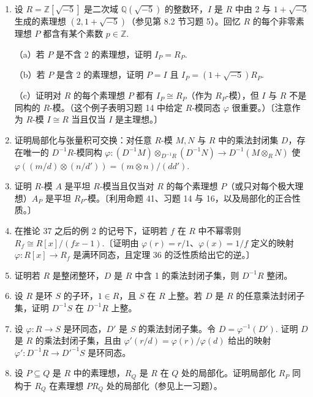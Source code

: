 \begin{enumerate}
\item 设 \(R = \mathbb{Z}[\sqrt{-5}]\) 是二次域 \(\mathbb{Q}(\sqrt{-5})\) 的整数环，\(I\) 是 \(R\) 中由 2 与 \(1+\sqrt{-5}\) 生成的素理想 \((2, 1+\sqrt{-5})\)（参见第 8.2 节习题 5）。回忆 \(R\) 的每个非零素理想 \(P\) 都含有某个素数 \(p \in \mathbb{Z}\).

（a）若 \(P\) 是不含 2 的素理想，证明 \(I_P = R_P\).

（b）若 \(P\) 是含 2 的素理想，证明 \(P = I\) 且 \(I_P = (1+\sqrt{-5})R_P\).

（c）证明对 \(R\) 的每个素理想 \(P\) 都有 \(I_P \cong R_P\)（作为 \(R_P\)-模），但 \(I\) 与 \(R\) 不是同构的 \(R\)-模。（这个例子表明习题 14 中给定 \(R\)-模同态 \(\varphi\) 很重要。）〔注意作为 \(R\)-模 \(I \cong R\) 当且仅当 \(I\) 是主理想。〕

\item 证明局部化与张量积可交换：对任意 \(R\)-模 \(M, N\) 与 \(R\) 中的乘法封闭集 \(D\)，存在唯一的 \(D^{-1}R\)-模同构 \(\varphi : (D^{-1}M)\otimes_{D^{-1}R}(D^{-1}N) \to D^{-1}(M \otimes_RN)\) 使 \(\varphi((m/d)\otimes(n/d')) = (m \otimes n)/(dd')\).

\item 证明 \(R\)-模 \(A\) 是平坦 \(R\)-模当且仅当对 \(R\) 的每个素理想 \(P\)（或只对每个极大理想）\(A_P\) 是平坦 \(R_P\)-模。〔利用命题 41、习题 14 与 16，以及局部化的正合性质。〕

\item 在推论 37 之后的例 2 的记号下，证明若 \(f\) 在 \(R\) 中不幂零则 \(R_f \cong R[x]/(fx-1)\).〔证明由 \(\varphi(r) = r/1\)、\(\varphi(x) = 1/f\) 定义的映射 \(\varphi : R[x] \to R_f\) 是满环同态，且定理 36 的泛性质给出它的逆。〕

\item 证明若 \(R\) 是整闭整环，\(D\) 是 \(R\) 中含 1 的乘法封闭子集，则 \(D^{-1}R\) 整闭。

\item 设 \(R\) 是环 \(S\) 的子环，\(1 \in R\)，且 \(S\) 在 \(R\) 上整。若 \(D\) 是 \(R\) 的任意乘法封闭子集，证明 \(D^{-1}S\) 在 \(D^{-1}R\) 上整。

\item 设 \(\varphi : R \to S\) 是环同态，\(D'\) 是 \(S\) 的乘法封闭子集。令 \(D = \varphi^{-1}(D')\). 证明 \(D\) 是 \(R\) 的乘法封闭子集，且由 \(\varphi'(r/d) = \varphi(r)/\varphi(d)\) 给出的映射 \(\varphi' : D^{-1}R \to D'^{-1}S\) 是环同态。

\item 设 \(P \subseteq Q\) 是 \(R\) 中的素理想，\(R_Q\) 是 \(R\) 在 \(Q\) 处的局部化。证明局部化 \(R_P\) 同构于 \(R_Q\) 在素理想 \(PR_Q\) 处的局部化（参见上一习题）。


\end{enumerate}
